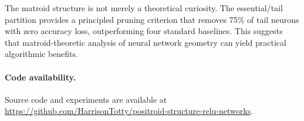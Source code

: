 \documentclass[11pt]{article}
\theoremstyle{definition}
\theoremstyle{remark}
\begin{document}
The matroid structure is not merely a theoretical curiosity.  The
essential/tail partition provides a principled pruning criterion that
removes 75\% of tail neurons with zero accuracy loss, outperforming
four standard baselines.  This suggests that matroid-theoretic analysis of
neural network geometry can yield practical algorithmic benefits.

\paragraph{Code availability.}
Source code and experiments are available at
\url{https://github.com/HarrisonTotty/positroid-structure-relu-networks}.




\end{document}
